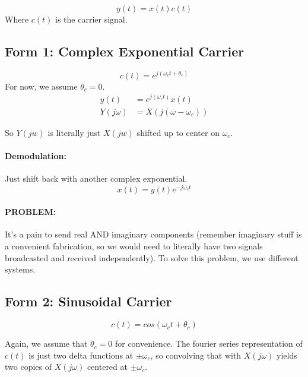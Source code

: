 \documentclass[a4paper,12pt]{report}
\begin{document}
\begin{equation}
y(t) = x(t)c(t)
\end{equation}
Where $c(t)$ is the carrier signal.

\subsection{Form 1: Complex Exponential Carrier}
\begin{equation}
c(t) = e^{j(\omega_c t + \theta_c)} 
\end{equation}
For now, we assume $\theta_c = 0$.
\begin{align}
y(t) &= e^{j(\omega_c t)} x(t) \\
Y(j\omega) &= X(j(\omega-\omega_c)) 
\end{align}

So $Y(jw)$ is literally just $X(jw)$ shifted up to center on $\omega_c$.

\paragraph{Demodulation: } Just shift back with another complex exponential.
\begin{equation}
x(t) = y(t) e^{-j\omega_c t} 
\end{equation}

\paragraph{PROBLEM: } It's a pain to send real AND imaginary components (remember imaginary stuff is a convenient fabrication, so we would need to literally have two signals broadcasted and received independently). To solve this problem, we use different systems.



\subsection{Form 2: Sinusoidal Carrier}

\begin{equation}
c(t) = cos(\omega_c t + \theta_c)
\end{equation}

Again, we assume that $\theta_c = 0$ for convenience. The fourier series representation of $c(t)$ is just two delta functions at $\pm \omega_c$, so convolving that with $X(j\omega)$ yields two copies of $X(j\omega)$ centered at $\pm \omega_c$.
\end{document}
